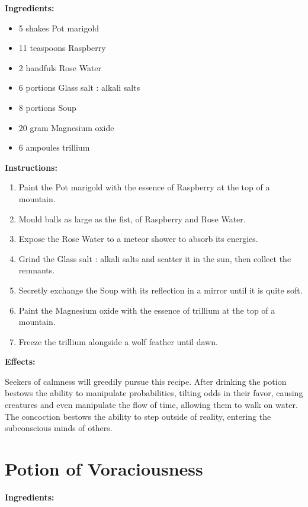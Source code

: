 \documentclass{article}
\begin{document}
\textbf{Ingredients:}

\begin{itemize}
  \item 5 shakes Pot marigold
  \item 11 teaspoons Raspberry
  \item 2 handfuls Rose Water
  \item 6 portions Glass salt : alkali salts
  \item 8 portions Soup
  \item 20 gram Magnesium oxide
  \item 6 ampoules trillium
\end{itemize}

\textbf{Instructions:}

\begin{enumerate}
  \item Paint the Pot marigold with the essence of Raspberry at the top of a mountain.
  \item Mould balls as large as the fist, of Raspberry and Rose Water.
  \item Expose the Rose Water to a meteor shower to absorb its energies.
  \item Grind the Glass salt : alkali salts and scatter it in the sun, then collect the remnants.
  \item Secretly exchange the Soup with its reflection in a mirror until it is quite soft.
  \item Paint the Magnesium oxide with the essence of trillium at the top of a mountain.
  \item Freeze the trillium alongside a wolf feather until dawn.
\end{enumerate}

\textbf{Effects:}

Seekers of calmness will greedily pursue this recipe. After drinking the potion bestows the ability to manipulate probabilities, tilting odds in their favor, causing creatures and even manipulate the flow of time, allowing them to walk on water. The concoction bestows the ability to step outside of reality, entering the subconscious minds of others.

\newpage
\section*{Potion of Voraciousness}

\textbf{Ingredients:}
\end{document}
